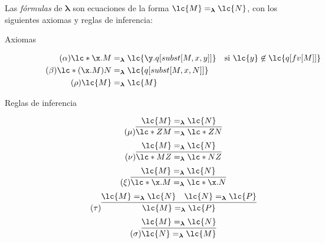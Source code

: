 \begin{defi} Las \emph{fórmulas} de \(\boldsymbol{\lambda}\) son ecuaciones de la forma \(\lc{M}=_{\boldsymbol{\lambda}}\lc{N}\), con los siguientes axiomas y reglas de inferencia:
  \label{definicion:teorialambda}
  \begin{description}
  \item[Axiomas]
    \begin{subequations}
      \begin{align}
        \label{definicion:teorialambda:alpha} \tag{\ensuremath{\alpha}}
        \lc*{\x.M}&=_{\boldsymbol{\lambda}}\lc{\y.q[subst[M,x,y]]} & &\text{si } \lc{y} \not\in \lc{q[fv[M]]}
        \\
        \label{definicion:teorialambda:beta} \tag{\ensuremath{\beta}}
        \lc*{(\x.M)N}&=_{\boldsymbol{\lambda}}\lc{q[subst[M,x,N]]}
        \\
        \label{definicion:teorialambda:rho} \tag{\ensuremath{\rho}}
        \lc{M}&=_{\boldsymbol{\lambda}}\lc{M}
      \end{align}
    \end{subequations}
  \item[Reglas de inferencia]
    \begin{equation}
      \label{definicion:teorialambda:mu} \tag{\ensuremath{\mu}}
      \infer{\lc*{Z M}=_{\boldsymbol{\lambda}}\lc*{Z N}}{\lc{M}=_{\boldsymbol{\lambda}}\lc{N}}
    \end{equation}
    \begin{equation}
      \label{definicion:teorialambda:nu} \tag{\ensuremath{\nu}}
        \infer{\lc*{M Z}=_{\boldsymbol{\lambda}}\lc*{N Z}}{\lc{M}=_{\boldsymbol{\lambda}}\lc{N}}
    \end{equation}
    \begin{equation}
      \label{definicion:teorialambda:xi} \tag{\ensuremath{\xi}}
      \infer{\lc*{\x.M}=_{\boldsymbol{\lambda}}\lc*{\x.N}}{\lc{M}=_{\boldsymbol{\lambda}}\lc{N}}
    \end{equation}
    \begin{equation}
      \label{definicion:teorialambda:tau} \tag{\ensuremath{\tau}}
        \infer{\lc{M}=_{\boldsymbol{\lambda}}\lc{P}}{\lc{M}=_{\boldsymbol{\lambda}}\lc{N} & \lc{N}=_{\boldsymbol{\lambda}}\lc{P}}
    \end{equation}
    \begin{equation}
      \label{definicion:teorialambda:sigma} \tag{\ensuremath{\sigma}}
      \infer{\lc{N}=_{\boldsymbol{\lambda}}\lc{M}}{\lc{M}=_{\boldsymbol{\lambda}}\lc{N}}
    \end{equation}
  \end{description}
\end{defi} \

